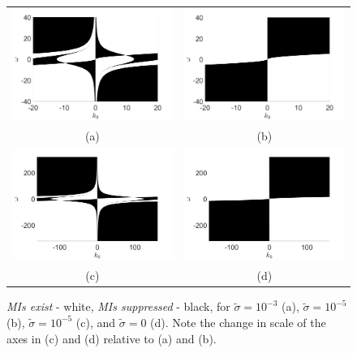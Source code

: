 \documentclass{JFM_Style/jfm}
\begin{document}
\begin{figure}
\centering
\begin{tabular}{cc}
\includegraphics[width=.48\textwidth]{foc_defoc_pos_cut} & \includegraphics[width=.48\textwidth]{foc_defoc_pos_cut_sig_1en5}\\
(a) & (b)\\
\includegraphics[width=.48\textwidth]{foc_defoc_pos_cut_sig_1en5_wide} & \includegraphics[width=.48\textwidth]{foc_defoc_pos_cut_sig_0_wide}\\
(c) & (d)
\end{tabular}
\caption{\small {\it MIs exist} - white, \small{\it MIs suppressed} - black, for $\tilde{\sigma}=10^{-3}$ (a), $\tilde{\sigma}=10^{-5}$ (b), $\tilde{\sigma}=10^{-5}$ (c), and $\tilde{\sigma}=0$ (d).  Note the change in scale of the axes in (c) and (d) relative to (a) and (b).}
\label{fig:miplot}
\end{figure}
\end{document}
